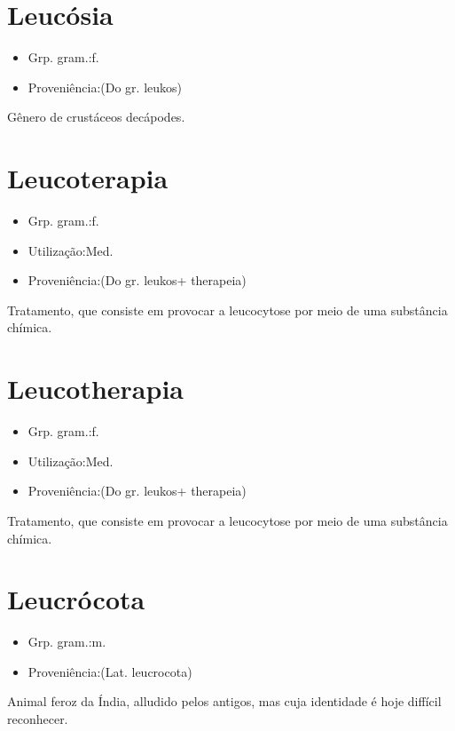 \section{Leucósia}
\begin{itemize}
\item {Grp. gram.:f.}
\end{itemize}
\begin{itemize}
\item {Proveniência:(Do gr. \textunderscore leukos\textunderscore )}
\end{itemize}
Gênero de crustáceos decápodes.
\section{Leucoterapia}
\begin{itemize}
\item {Grp. gram.:f.}
\end{itemize}
\begin{itemize}
\item {Utilização:Med.}
\end{itemize}
\begin{itemize}
\item {Proveniência:(Do gr. \textunderscore leukos\textunderscore  + \textunderscore therapeia\textunderscore )}
\end{itemize}
Tratamento, que consiste em provocar a leucocytose por meio de uma substância chímica.
\section{Leucotherapia}
\begin{itemize}
\item {Grp. gram.:f.}
\end{itemize}
\begin{itemize}
\item {Utilização:Med.}
\end{itemize}
\begin{itemize}
\item {Proveniência:(Do gr. \textunderscore leukos\textunderscore  + \textunderscore therapeia\textunderscore )}
\end{itemize}
Tratamento, que consiste em provocar a leucocytose por meio de uma substância chímica.
\section{Leucrócota}
\begin{itemize}
\item {Grp. gram.:m.}
\end{itemize}
\begin{itemize}
\item {Proveniência:(Lat. \textunderscore leucrocota\textunderscore )}
\end{itemize}
Animal feroz da Índia, alludido pelos antigos, mas cuja identidade é hoje diffícil reconhecer.
